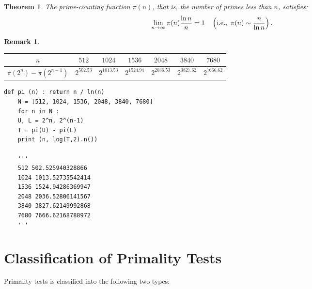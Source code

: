 \documentclass[12pt,openany]{book}
\newtheorem{theorem}{Theorem}[chapter]
\theoremstyle{definition}
\newtheorem{remark}{Remark}[chapter]
\newcommand{\ie}{\textnormal{i.e.}}
\newcommand{\of}[1]{\left( #1 \right)}
\begin{document}
	\begin{tcolorbox}[colback=white,colframe=thmcolor,arc=5pt,title={\color{white}\bf Prime Number Theorem}]
		\begin{theorem}
			The prime-counting function $\pi(n)$, that is, the number of primes less than $n$, satisfies: \[
			\lim\limits_{n\to\infty}\pi(n)\frac{\ln n}{n}=1\quad\of{\ie,\ \pi(n)\sim\frac{n}{\ln n}}.
			\]
		\end{theorem}
	\end{tcolorbox}
	\vspace{4pt}
	\begin{remark}
		\ \begin{table}[h]
			\centering
			\begin{tabular*}{\textwidth}{@{\extracolsep{\fill}}ccccccc}
				\toprule[1.2pt]
				$n$ & $512$ & $1024$ & $1536$ & $2048$ & $3840$ & $7680$ \\
				\midrule
				$\pi(2^n)-\pi(2^{n-1})$ & $2^{502.53}$ & $2^{1013.53}$ & $2^{1524.94}$ & $2^{2036.53}$ & $2^{3827.62}$ & $2^{7666.62}$ \\
				\bottomrule[1.2pt]
			\end{tabular*}
		\end{table}
	\end{remark}
	\vspace{4pt}
	\begin{lstlisting}[style=sage, caption={Prime-Counting Function (Sage)},captionpos=t]
	def pi (n) : return n / ln(n)
	N = [512, 1024, 1536, 2048, 3840, 7680]
	for n in N :
	U, L = 2^n, 2^(n-1)
	T = pi(U) - pi(L)
	print (n, log(T,2).n())
	
	'''
	512 502.525940328866
	1024 1013.52735542414
	1536 1524.94286369947
	2048 2036.52806141567
	3840 3827.62149992868
	7680 7666.62168788972
	'''
	\end{lstlisting}
	
	\newpage
	\section{Classification of Primality Tests}
	Primality tests is classified into the following two types:
	
\end{document}
